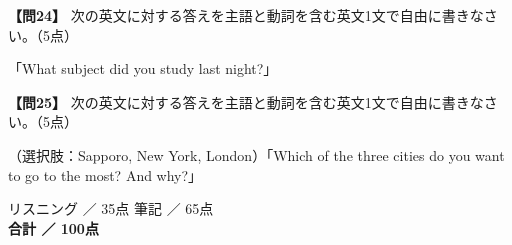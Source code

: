 \testquestionwide
\noindent\textbf{【問24】} 次の英文に対する答えを主語と動詞を含む英文1文で自由に書きなさい。（5点）

\noindent「What subject did you study last night?」

\testqsep

\testquestionwide
\noindent\textbf{【問25】} 次の英文に対する答えを主語と動詞を含む英文1文で自由に書きなさい。（5点）

\noindent（選択肢：Sapporo, New York, London）「Which of the three cities do you want to go to the most? And why?」

\vspace{0.5em}
\testqsep

\begin{flushright}
リスニング \underline{\hspace{8em}} ／ 35点\qquad
筆記 \underline{\hspace{8em}} ／ 65点\\[1.5em]
\textbf{合計 \underline{\hspace{8em}} ／ 100点}
\end{flushright}
